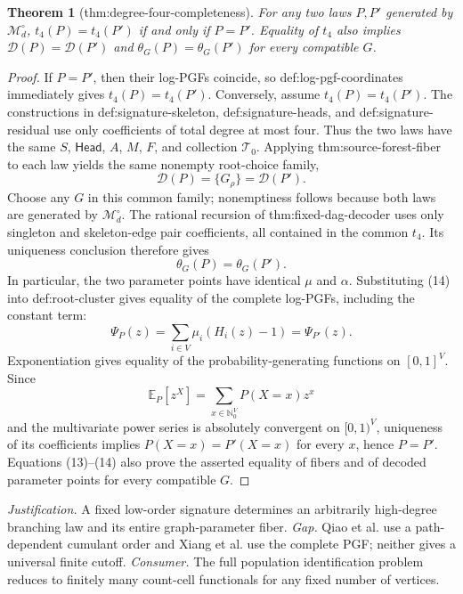 \documentclass{article}
\newtheorem{theorem}{Theorem}
\begin{document}
\begin{theorem}[thm:degree-four-completeness]\label{thm:degree-four-completeness}
For any two laws \(P,P'\) generated by \(\mathcal M_d^\circ\), \(t_4(P)=t_4(P')\) if and only if \(P=P'\). Equality of \(t_4\) also implies \(\mathcal D(P)=\mathcal D(P')\) and \(\theta_G(P)=\theta_G(P')\) for every compatible \(G\).
\end{theorem}
\begin{proof}
If \(P=P'\), then their log-PGFs coincide, so def:log-pgf-coordinates immediately gives \(t_4(P)=t_4(P')\).  Conversely, assume \(t_4(P)=t_4(P')\).  The constructions in def:signature-skeleton, def:signature-heads, and def:signature-residual use only coefficients of total degree at most four.  Thus the two laws have the same \(S\), \(\mathsf{Head}\), \(A\), \(M\), \(F\), and collection \(\mathcal T_0\).  Applying thm:source-forest-fiber to each law yields the same nonempty root-choice family,
\[
 \mathcal D(P)=\{G_\rho\}=\mathcal D(P').
\tag{13}
\]
Choose any \(G\) in this common family; nonemptiness follows because both laws are generated by \(\mathcal M_d^\circ\).  The rational recursion of thm:fixed-dag-decoder uses only singleton and skeleton-edge pair coefficients, all contained in the common \(t_4\).  Its uniqueness conclusion therefore gives
\[
 \theta_G(P)=\theta_G(P').
\tag{14}
\]
In particular, the two parameter points have identical \(\mu\) and \(\alpha\).  Substituting (14) into def:root-cluster gives equality of the complete log-PGFs, including the constant term:
\[
 \Psi_P(z)=\sum_{i\in V}\mu_i(H_i(z)-1)=\Psi_{P'}(z).
\]
Exponentiation gives equality of the probability-generating functions on \([0,1]^V\).  Since
\[
 \mathbb E_P[z^X]=\sum_{x\in\mathbb N_0^V}P(X=x)z^x
\]
and the multivariate power series is absolutely convergent on \([0,1)^V\), uniqueness of its coefficients implies \(P(X=x)=P'(X=x)\) for every \(x\), hence \(P=P'\).  Equations (13)--(14) also prove the asserted equality of fibers and of decoded parameter points for every compatible \(G\).
\end{proof}
\par\smallskip\noindent \textit{Justification.} A fixed low-order signature determines an arbitrarily high-degree branching law and its entire graph-parameter fiber. \textit{Gap.} Qiao et al. use a path-dependent cumulant order and Xiang et al. use the complete PGF; neither gives a universal finite cutoff. \textit{Consumer.} The full population identification problem reduces to finitely many count-cell functionals for any fixed number of vertices.
\end{document}
